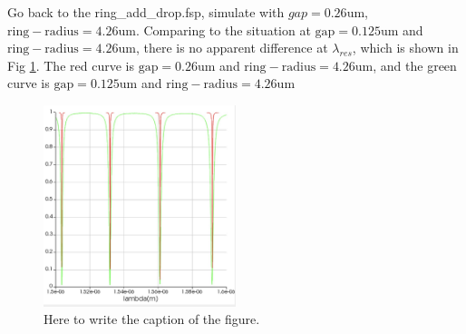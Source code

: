 \documentclass[fontsize=11pt]{scrartcl}
\begin{document}
 Go back to the ring\_add\_drop.fsp, simulate with $gap=0.26\mathrm{um}$, 
 $\mathrm{ring-radius}=4.26\mathrm{um}$. Comparing to the situation at $\mathrm{gap}=0.125\mathrm{um}$ 
 and $\mathrm{ring-radius}=4.26\mathrm{um}$, there is no apparent difference at $\lambda_{res}$, 
 which is shown in Fig \ref{fig3.3}. The red curve is $\mathrm{gap}=0.26\mathrm{um}$ and 
 $\mathrm{ring-radius}=4.26\mathrm{um}$, and the green curve is 
 $\mathrm{gap}=0.125\mathrm{um}$ and 
 $\mathrm{ring-radius}=4.26\mathrm{um}$
 \begin{figure}[H]
    \centering
     \includegraphics[width=0.5\textwidth]{img/fig3.3.png}
     \caption{Here to write the caption of the figure.}
     \label{fig3.3}
\end{figure}  
\pagebreak

% 
% 
\end{document}
